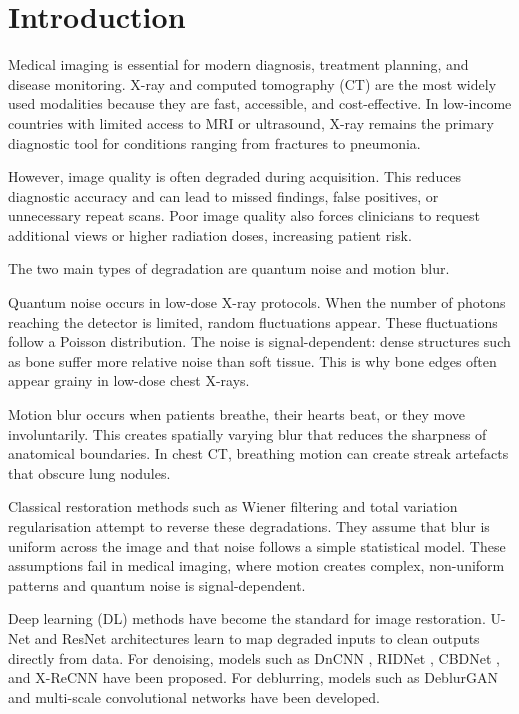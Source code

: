 
\section{Introduction}
\label{sec:introduction}

Medical imaging is essential for modern diagnosis, treatment planning, and disease monitoring. X-ray and computed tomography (CT) are the most widely used modalities because they are fast, accessible, and cost-effective. In low-income countries with limited access to MRI or ultrasound, X-ray remains the primary diagnostic tool for conditions ranging from fractures to pneumonia.

However, image quality is often degraded during acquisition. This reduces diagnostic accuracy and can lead to missed findings, false positives, or unnecessary repeat scans. Poor image quality also forces clinicians to request additional views or higher radiation doses, increasing patient risk.

The two main types of degradation are quantum noise and motion blur.

Quantum noise occurs in low-dose X-ray protocols. When the number of photons reaching the detector is limited, random fluctuations appear. These fluctuations follow a Poisson distribution. The noise is signal-dependent: dense structures such as bone suffer more relative noise than soft tissue. This is why bone edges often appear grainy in low-dose chest X-rays.

Motion blur occurs when patients breathe, their hearts beat, or they move involuntarily. This creates spatially varying blur that reduces the sharpness of anatomical boundaries. In chest CT, breathing motion can create streak artefacts that obscure lung nodules.

Classical restoration methods such as Wiener filtering and total variation regularisation attempt to reverse these degradations. They assume that blur is uniform across the image and that noise follows a simple statistical model. These assumptions fail in medical imaging, where motion creates complex, non-uniform patterns and quantum noise is signal-dependent.

Deep learning (DL) methods have become the standard for image restoration. U-Net and ResNet architectures learn to map degraded inputs to clean outputs directly from data. For denoising, models such as DnCNN \citep{zhang2017beyond}, RIDNet \citep{anwar2019real}, CBDNet \citep{guo2019toward}, and X-ReCNN \citep{jin2019chest} have been proposed. For deblurring, models such as DeblurGAN~\citep{kupyn2019deblurgan} and multi-scale convolutional networks have been developed.

